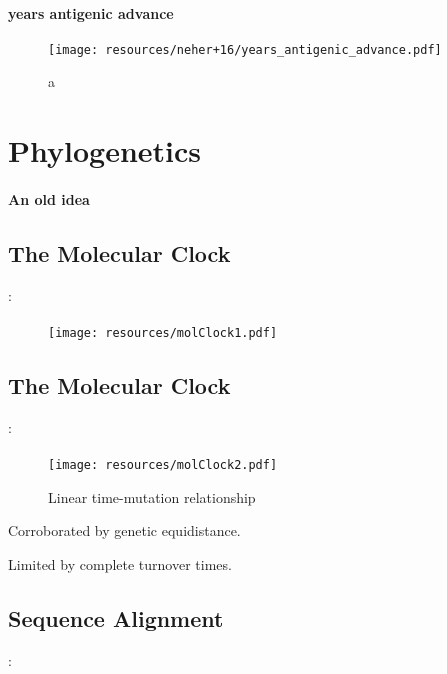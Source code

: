 \documentclass{beamer}
\begin{document}
\begin{darkframes}
    \begin{frame}{\subsecname}
      \framesubtitle{years antigenic advance}
      \begin{figure}
        \texttt{[image: resources/neher+16/years\_antigenic\_advance.pdf]}
        \caption{\footnotesize a}
      \end{figure}
    \end{frame}











  \section{Phylogenetics}

    \begin{frame}{\secname}
      \framesubtitle{An old idea}
    \end{frame}

    \subsection{The Molecular Clock}
    \begin{frame}{\secname : \subsecname}
      \framesubtitle{}
      \begin{figure}
        \texttt{[image: resources/molClock1.pdf]}
        \caption{\footnotesize }
      \end{figure}
    \end{frame}

    \subsection{The Molecular Clock}
    \begin{frame}{\secname : \subsecname}
      \framesubtitle{}
      \begin{figure}
        \texttt{[image: resources/molClock2.pdf]}
        \caption{\footnotesize Linear time-mutation relationship}
      \end{figure}
      \vspace*{-.2cm}
      Corroborated by genetic equidistance.

      Limited by complete turnover times.
    \end{frame}

    \subsection{Sequence Alignment}
    \begin{frame}{\secname : \subsecname}
      \framesubtitle{}
    \end{frame}


\end{darkframes}
\end{document}
